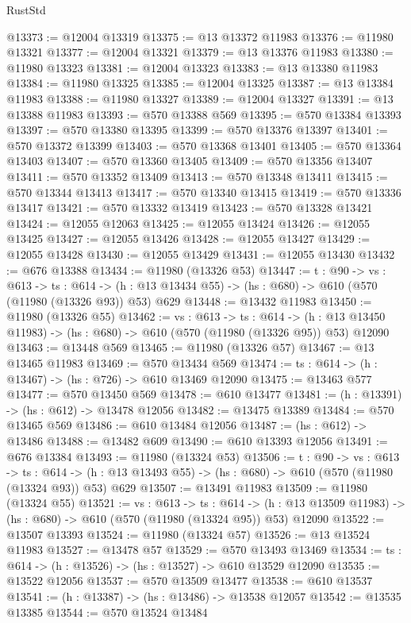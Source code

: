 \begin{lexlean}{RustStd}
\begin{coremodule}
@13373 := @12004 @13319
@13375 := @13 @13372 @11983
@13376 := @11980 @13321
@13377 := @12004 @13321
@13379 := @13 @13376 @11983
@13380 := @11980 @13323
@13381 := @12004 @13323
@13383 := @13 @13380 @11983
@13384 := @11980 @13325
@13385 := @12004 @13325
@13387 := @13 @13384 @11983
@13388 := @11980 @13327
@13389 := @12004 @13327
@13391 := @13 @13388 @11983
@13393 := @570 @13388 @569
@13395 := @570 @13384 @13393
@13397 := @570 @13380 @13395
@13399 := @570 @13376 @13397
@13401 := @570 @13372 @13399
@13403 := @570 @13368 @13401
@13405 := @570 @13364 @13403
@13407 := @570 @13360 @13405
@13409 := @570 @13356 @13407
@13411 := @570 @13352 @13409
@13413 := @570 @13348 @13411
@13415 := @570 @13344 @13413
@13417 := @570 @13340 @13415
@13419 := @570 @13336 @13417
@13421 := @570 @13332 @13419
@13423 := @570 @13328 @13421
@13424 := @12055 @12063
@13425 := @12055 @13424
@13426 := @12055 @13425
@13427 := @12055 @13426
@13428 := @12055 @13427
@13429 := @12055 @13428
@13430 := @12055 @13429
@13431 := @12055 @13430
@13432 := @676 @13388
@13434 := @11980 (@13326 @53)
@13447 := {t : @90} ->
  {vs : @613} ->
  {ts : @614} -> (h : @13 @13434 @55) -> (hs : @680) -> @610 (@570 (@11980 (@13326 @93)) @53) @629
@13448 := @13432 @11983
@13450 := @11980 (@13326 @55)
@13462 := {vs : @613} ->
  {ts : @614} ->
  (h : @13 @13450 @11983) -> (hs : @680) -> @610 (@570 (@11980 (@13326 @95)) @53) @12090
@13463 := @13448 @569
@13465 := @11980 (@13326 @57)
@13467 := @13 @13465 @11983
@13469 := @570 @13434 @569
@13474 := {ts : @614} -> (h : @13467) -> (hs : @726) -> @610 @13469 @12090
@13475 := @13463 @577
@13477 := @570 @13450 @569
@13478 := @610 @13477
@13481 := (h : @13391) -> (hs : @612) -> @13478 @12056
@13482 := @13475 @13389
@13484 := @570 @13465 @569
@13486 := @610 @13484 @12056
@13487 := (hs : @612) -> @13486
@13488 := @13482 @609
@13490 := @610 @13393 @12056
@13491 := @676 @13384
@13493 := @11980 (@13324 @53)
@13506 := {t : @90} ->
  {vs : @613} ->
  {ts : @614} -> (h : @13 @13493 @55) -> (hs : @680) -> @610 (@570 (@11980 (@13324 @93)) @53) @629
@13507 := @13491 @11983
@13509 := @11980 (@13324 @55)
@13521 := {vs : @613} ->
  {ts : @614} ->
  (h : @13 @13509 @11983) -> (hs : @680) -> @610 (@570 (@11980 (@13324 @95)) @53) @12090
@13522 := @13507 @13393
@13524 := @11980 (@13324 @57)
@13526 := @13 @13524 @11983
@13527 := @13478 @57
@13529 := @570 @13493 @13469
@13534 := {ts : @614} -> (h : @13526) -> (hs : @13527) -> @610 @13529 @12090
@13535 := @13522 @12056
@13537 := @570 @13509 @13477
@13538 := @610 @13537
@13541 := (h : @13387) -> (hs : @13486) -> @13538 @12057
@13542 := @13535 @13385
@13544 := @570 @13524 @13484

\end{coremodule}
\end{lexlean}
